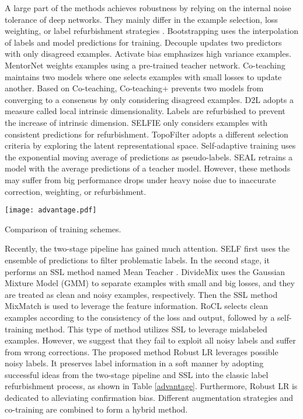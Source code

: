 \documentclass[letterpaper]{article} \usepackage{aaai23}  \usepackage{times}  \usepackage{helvet}  \usepackage{courier}  \usepackage[hyphens]{url}  \usepackage{graphicx} \urlstyle{rm} \def\UrlFont{\rm}  \usepackage{natbib}  \usepackage{caption} \frenchspacing  \setlength{\pdfpagewidth}{8.5in} \setlength{\pdfpageheight}{11in} \usepackage{algorithm}
\begin{document}
A large part of the methods achieves robustness by relying on the internal noise tolerance of deep networks.
They mainly differ in the example selection, loss weighting, or label refurbishment strategies \cite{frenay2013classification,algan2021image,DBLP:conf/icml/SongK019}.
Bootstrapping \cite{reed2014training} uses the interpolation of labels and model predictions for training.
Decouple \cite{malach2017decoupling} updates two predictors with only disagreed examples.
Activate bias \cite{chang2017active} emphasizes high variance examples.
MentorNet \cite{jiang2018mentornet} weights examples using a pre-trained teacher network.
Co-teaching \cite{han2018co} maintains two models where one selects examples with small losses to update another.
Based on Co-teaching, Co-teaching+ \cite{yu2019does} prevents two models from converging to a consensus by only considering disagreed examples.
D2L \cite{ma2018dimensionality} adopts a measure called local intrinsic dimensionality.
Labels are refurbished to prevent the increase of intrinsic dimension.
SELFIE \cite{DBLP:conf/icml/SongK019} only considers examples with consistent predictions for refurbishment.
TopoFilter \cite{wu2020topological} adopts a different selection criteria by exploring the latent representational space.
Self-adaptive training \cite{huang2020self} uses the exponential moving average of predictions as pseudo-labels.
SEAL \cite{chen2020beyond} retrains a model with the average predictions of a teacher model.
However, these methods may suffer from big performance drops under heavy noise due to inaccurate correction, weighting, or refurbishment. 

\begin{table}
    \texttt{[image: advantage.pdf]} 
    \centering
    \caption{Comparison of training schemes.
    }
    \label{advantage}
\end{table}

Recently, the two-stage pipeline has gained much attention.
SELF \cite{nguyen2019self} first uses the ensemble of predictions to filter problematic labels.
In the second stage, it performs an SSL method named Mean Teacher \cite{tarvainen2017mean}.
DivideMix \cite{li2020dividemix} uses the Gaussian Mixture Model (GMM) to separate examples with small and big losses, and they are treated as clean and noisy examples, respectively.
Then the SSL method MixMatch \cite{berthelot2019mixmatch} is used to leverage the feature information.
RoCL \cite{zhou2021robust} selects clean examples according to the consistency of the loss and output, followed by a self-training method.
This type of method utilizes SSL to leverage mislabeled examples.
However, we suggest that they fail to exploit all noisy labels and suffer from wrong corrections.
The proposed method Robust LR leverages possible noisy labels.
It preserves label information in a soft manner by adopting successful ideas from the two-stage pipeline and SSL into the classic label refurbishment process, as shown in Table \ref{advantage}.
Furthermore, Robust LR is dedicated to alleviating confirmation bias. 
Different augmentation strategies and co-training are combined to form a hybrid method.
\end{document}
